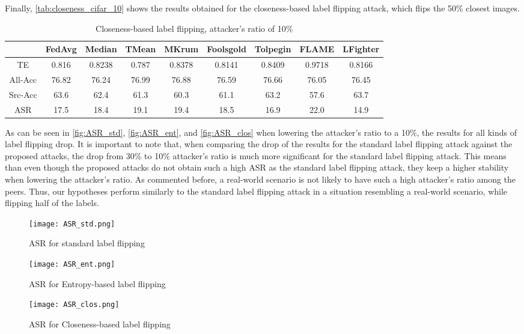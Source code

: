 Finally, \autoref{tab:closeness_cifar_10} shows the results obtained for the closeness-based label flipping attack, which flips the 50\% closest images.

\begin{table}[h!]
    \centering
    \small
    \begin{adjustbox}{center}
    \begin{tabular}{|c|c|c|c|c|c|c|c|c|}
        \hline
        & FedAvg & Median & TMean & MKrum & Foolsgold & Tolpegin & FLAME & LFighter \\
        \hline
        TE & 0.816 & 0.8238 & 0.787 & 0.8378 & 0.8141 & 0.8409 & 0.9718 & 0.8166 \\
        \hline
        All-Acc & 76.82 & 76.24 & 76.99 & 76.88 & 76.59 & 76.66 & 76.05 & 76.45 \\
        \hline
        Src-Acc & 63.6 & 62.4 & 61.3 & 60.3 & 61.1 & 63.2 & 57.6 & 63.7 \\
        \hline
        ASR & 17.5 & 18.4 & 19.1 & 19.4 & 18.5 & 16.9 & 22.0 & 14.9 \\
        \hline
    \end{tabular}
    \end{adjustbox}
    \caption{Closeness-based label flipping, attacker's ratio of 10\%}
    \label{tab:closeness_cifar_10}
\end{table}

As can be seen in \autoref{fig:ASR_std}, \autoref{fig:ASR_ent}, and \autoref{fig:ASR_clos} when lowering the attacker's ratio to a 10\%, the results for all kinds of label flipping drop. It is important to note that, when comparing the drop of the results for the standard label flipping attack against the proposed attacks, the drop from 30\% to 10\% attacker's ratio is much more significant for the standard label flipping attack. This means than even though the proposed attacks do not obtain such a high ASR as the standard label flipping attack, they keep a higher stability when lowering the attacker's ratio. As commented before, a real-world scenario is not likely to have such a high attacker's ratio among the peers. Thus, our hypotheses perform similarly to the standard label flipping attack in a situation resembling a real-world scenario, while flipping half of the labels.

\begin{figure}[h!]
    \centering
    \texttt{[image: ASR\_std.png]}
    \caption{ASR for standard label flipping}
    \label{fig:ASR_std}
\end{figure}

\begin{figure}[h!]
    \centering
    \texttt{[image: ASR\_ent.png]}
    \caption{ASR for Entropy-based label flipping}
    \label{fig:ASR_ent}
\end{figure}

\begin{figure}[h!]
    \centering
    \texttt{[image: ASR\_clos.png]}
    \caption{ASR for Closeness-based label flipping}
    \label{fig:ASR_clos}
\end{figure}
 
\pagebreak
